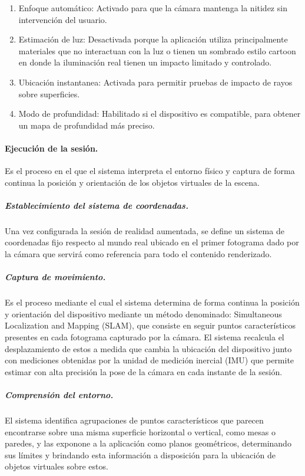             \begin{enumerate}
                
                \item Enfoque automático: Activado para que la cámara mantenga la nitidez sin intervención del usuario.

                \item Estimación de luz: Desactivada porque la aplicación utiliza principalmente materiales que no interactuan con la luz o tienen un sombrado estilo cartoon en donde la iluminación real tienen un impacto limitado y controlado.

                \item Ubicación instantanea: Activada para permitir pruebas de impacto de rayos sobre superficies.

                \item Modo de profundidad: Habilitado si el dispositivo es compatible, para obtener un mapa de profundidad más preciso.

            \end{enumerate}

            \paragraph{Ejecución de la sesión.}Es el proceso en el que el sistema interpreta el entorno físico y captura de forma continua la posición y orientación de los objetos virtuales de la escena. 

            \subparagraph{Establecimiento del sistema de coordenadas.}Una vez configurada la sesión de realidad aumentada, se define un sistema de coordenadas fijo respecto al mundo real ubicado en el primer fotograma dado por la cámara que servirá como referencia para todo el contenido renderizado.

            \subparagraph{Captura de movimiento.}Es el proceso mediante el cual el sistema determina de forma continua la posición y orientación del dispositivo mediante un método denominado: Simultaneous Localization and Mapping (SLAM), que consiste en seguir puntos característicos presentes en cada fotograma capturado por la cámara. El sistema recalcula el desplazamiento de estos a medida que cambia la ubicación del dispositivo junto con mediciones obtenidas por la unidad de medición inercial (IMU) que permite estimar con alta precisión la pose de la cámara en cada instante de la sesión.

            \subparagraph{Comprensión del entorno.}El sistema identifica agrupaciones de puntos característicos que parecen encontrarse sobre una misma superficie horizontal o vertical, como mesas o paredes, y las exponone a la aplicación como planos geométricos, determinando sus límites y brindando esta información a disposición para la ubicación de objetos virtuales sobre estos.

